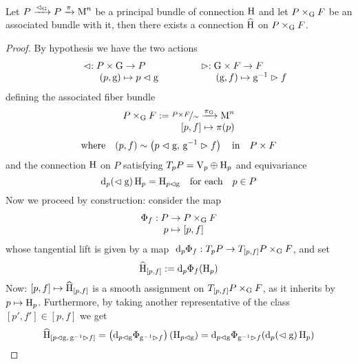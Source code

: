 \begin{teo}
    Let $P\xrightarrow{\vartriangleleft_{\text{\normalfont G}}}P\xrightarrow{\pi}\text{\normalfont M}^n$ be a principal bundle of connection $\text{\normalfont H}$ and let $P\times_{\text{\normalfont G}} F$ be an associated bundle with it, then there exists a connection $\widehat{\text{\normalfont H}}$ on $P\times_{\text{\normalfont G}} F$. 
\end{teo}
\begin{proof}
    By hypothesis we have the two actions
    $$\begin{matrix}
        \vartriangleleft:P\times\text{\normalfont G}\to P\\
    \qquad\quad(p,\text{\normalfont g})\mapsto p\vartriangleleft\text{\normalfont g}\end{matrix}\qquad\begin{matrix}
        \vartriangleright:\text{\normalfont G}\times F\to F\\
        \qquad\qquad (\text{\normalfont g},f)\mapsto\text{\normalfont g}^{-1}\vartriangleright f
    \end{matrix}$$
    defining the associated fiber bundle 
    $$\begin{matrix}
        P\times_{\text{\normalfont G}} F:=\nicefrac{P\times F}{\sim}\xrightarrow{\pi_{\text{\normalfont G}}}\text{\normalfont M}^n\\
        \qquad\qquad\qquad[p,f]\mapsto\pi(p)
    \end{matrix}$$
    $$\text{where}\quad(p,f)\sim\left(p\vartriangleleft\text{\normalfont g},\,\text{\normalfont g}^{-1}\vartriangleright f\right)\quad\text{in}\quad P\times F$$
    and the connection $\text{\normalfont H}$ on $P$ satisfying $T_pP=\text{\normalfont V}_p\oplus\text{\normalfont H}_p$ and equivariance
    $$\text{\normalfont d}_p(\vartriangleleft\text{\normalfont g})\,\text{\normalfont H}_p=\text{\normalfont H}_{p\vartriangleleft\text{\normalfont g}}\quad\text{for each}\quad p\in P$$
    Now we proceed by construction: consider the map
    $$\begin{matrix}
        \Phi_f:P\to P\times_{\text{\normalfont G}} F\\
        \quad p\mapsto[p,f]
    \end{matrix}$$
whose tangential lift is given by a map $\,\,\text{\normalfont d}_p\Phi_f:T_pP\to T_{[p,f]}P\times_{\text{\normalfont G}} F$, and set
$$\widehat{\text{\normalfont H}}_{[p,f]}:=\text{\normalfont d}_p\Phi_f(\text{\normalfont H}_p)$$
Now: $[p,f]\mapsto\widehat{\text{\normalfont H}}_{[p,f]}$ is a smooth assignment on $T_{[p,f]}P\times_{\text{\normalfont G}} F$, as it inherits by $p\mapsto\text{\normalfont H}_p$. Furthermore, by taking another representative of the class $[p',f']\in[p,f]$ we get
\begin{align*}
    \widehat{\H}_{\left[p\vartriangleleft\g,\,\g^{-1}\vartriangleright f\right]}&=\left(\d_{p\vartriangleleft\g}\Phi_{\g^{-1}\vartriangleright f}\right)(\H_{p\vartriangleleft\g})=\d_{p\vartriangleleft\g}\Phi_{\g^{-1}\vartriangleright f}(\d_p(\vartriangleleft\g)\,\H_p)\\

\end{align*}
\end{proof}
